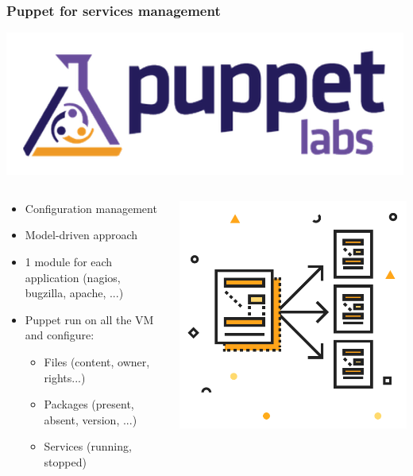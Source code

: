 \documentclass[11pt,compress]{beamer}
\begin{document}
\begin{frame}
\frametitle{Puppet for services management}
\begin{center}
\includegraphics[scale=0.2]{figures/puppet}
\end{center}
\begin{columns}
\begin{column}{8cm}
\begin{itemize}
\item Configuration management
\item Model-driven approach
\item 1 module for each application (nagios, bugzilla, apache, ...)
\item Puppet run on all the VM and configure:
\begin{itemize}
\item Files (content, owner, rights...)
\item Packages (present, absent, version, ...)
\item Services (running, stopped)
\end{itemize}
\end{itemize}
\end{column}
\begin{column}{3cm}
\includegraphics[scale=0.15]{figures/puppet_config}
\end{column}
\end{columns}
\end{frame}
\end{document}

